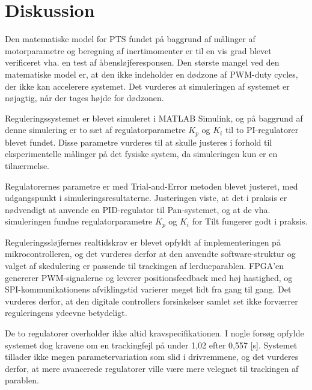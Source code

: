 \section{Diskussion}
\label{sec:diskussion}
Den matematiske model for PTS fundet på baggrund af
målinger af motorparametre og beregning af inertimomenter
er til en vis grad blevet verificeret vha. en test af åbensløjferesponsen.
Den største mangel ved den matematiske model er, at den ikke indeholder en dødzone
af PWM-duty cycles, der ikke kan accelerere systemet. Det vurderes
at simuleringen af systemet er nøjagtig, når der tages højde for dødzonen.

Reguleringssystemet er blevet simuleret i MATLAB Simulink, og på baggrund af denne simulering
er to sæt af regulatorparametre \(K_p\) og \(K_i\) til to PI-regulatorer blevet fundet.
Disse parametre vurderes til at skulle justeres
i forhold til eksperimentelle målinger på det fysiske system, da simuleringen kun er en tilnærmelse.

Regulatorernes parametre er med Trial-and-Error metoden blevet justeret,
med udgangspunkt i simuleringsresultaterne.
Justeringen viste, at det i praksis er nødvendigt at anvende en PID-regulator til Pan-systemet,
og at de vha. simuleringen fundne regulatorparametre \(K_p\) og \(K_i\) for Tilt fungerer godt i praksis.


Reguleringssløjfernes realtidskrav er blevet opfyldt af implementeringen på mikrocontrolleren,
og det vurderes derfor at den anvendte software-struktur og valget af skedulering
er passende til trackingen af lerdueparablen.
FPGA'en genererer PWM-signalerne og leverer positionsfeedback med høj hastighed,
og SPI-kommunikationens afviklingstid varierer meget lidt fra gang til gang.
Det vurderes derfor, at den digitale controllers forsinkelser samlet set ikke forværrer
reguleringens ydeevne betydeligt.

De to regulatorer overholder ikke altid kravspecifikationen.
I nogle forsøg opfylde systemet dog kravene om en trackingfejl på under 1,02\degree{}
efter 0,557 [s].
Systemet tillader ikke megen parametervariation
som slid i drivremmene,
og det vurderes derfor, at mere avancerede regulatorer ville være mere velegnet til trackingen
af parablen.